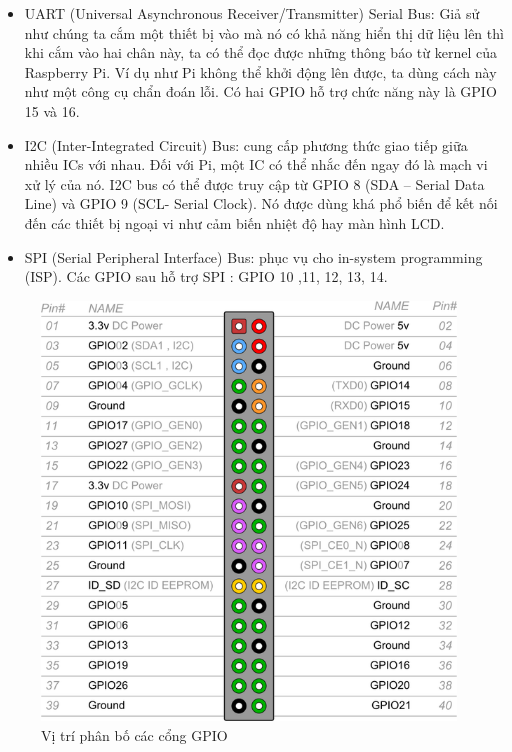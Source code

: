 \documentclass[12pt,a4paper,oneside]{extbook}
\begin{document}
\begin{itemize}[topsep=1mm,itemsep=-0.5mm]
\item UART (Universal Asynchronous Receiver/Transmitter) Serial Bus: Giả sử như chúng ta cắm một thiết bị vào mà nó có khả năng hiển thị dữ liệu lên thì khi cắm vào hai chân này, ta có thể đọc được những thông báo từ kernel của Raspberry Pi. Ví dụ như Pi không thể khởi động lên được, ta dùng cách này như một công cụ chẩn đoán lỗi. Có hai GPIO hỗ trợ chức năng này là GPIO 15 và 16.

\item I2C (Inter-Integrated Circuit) Bus: cung cấp phương thức giao tiếp giữa nhiều ICs với nhau. Đối với Pi, một IC có thể nhắc đến ngay đó là mạch vi xử lý của nó. I2C bus có thể được truy cập từ GPIO 8 (SDA – Serial Data Line) và GPIO 9 (SCL- Serial Clock). Nó được dùng khá phổ biến để kết nối đến các thiết bị ngoại vi như cảm biến nhiệt độ hay màn hình LCD.

\item SPI (Serial Peripheral Interface) Bus: phục vụ cho in-system programming (ISP). Các GPIO sau hỗ trợ SPI : GPIO 10 ,11, 12, 13, 14.
\vspace{1mm}
\end{itemize}

\begin{figure}[h]
  \centering
     \includegraphics[width=11cm]{4-pi3-gpio}
  \caption{Vị trí phân bố các cổng GPIO}\label{fig:4-pi3-gpio}
\end{figure}
\end{document}

